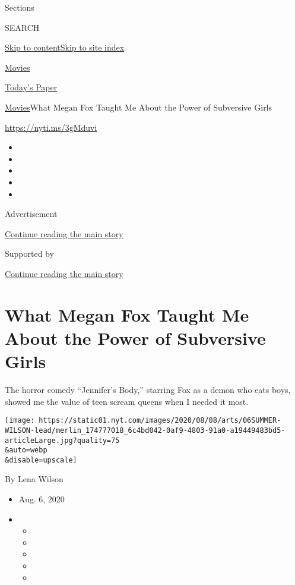 Sections

SEARCH

\protect\hyperlink{site-content}{Skip to
content}\protect\hyperlink{site-index}{Skip to site index}

\href{https://www.nytimes.com/section/movies}{Movies}

\href{https://myaccount.nytimes.com/auth/login?response_type=cookie\&client_id=vi}{}

\href{https://www.nytimes.com/section/todayspaper}{Today's Paper}

\href{/section/movies}{Movies}\textbar{}What Megan Fox Taught Me About
the Power of Subversive Girls

\href{https://nyti.ms/3gMduvi}{https://nyti.ms/3gMduvi}

\begin{itemize}
\item
\item
\item
\item
\item
\end{itemize}

Advertisement

\protect\hyperlink{after-top}{Continue reading the main story}

Supported by

\protect\hyperlink{after-sponsor}{Continue reading the main story}

\hypertarget{what-megan-fox-taught-me-about-the-power-of-subversive-girls}{%
\section{What Megan Fox Taught Me About the Power of Subversive
Girls}\label{what-megan-fox-taught-me-about-the-power-of-subversive-girls}}

The horror comedy ``Jennifer's Body,'' starring Fox as a demon who eats
boys, showed me the value of teen scream queens when I needed it most.

\texttt{[image: https://static01.nyt.com/images/2020/08/08/arts/06SUMMER-WILSON-lead/merlin\_174777018\_6c4bd042-0af9-4803-91a0-a19449483bd5-articleLarge.jpg?quality=75\\\&auto=webp\\\&disable=upscale]}

By Lena Wilson

\begin{itemize}
\item
  Aug. 6, 2020
\item
  \begin{itemize}
  \item
  \item
  \item
  \item
  \item
  \end{itemize}
\end{itemize}

